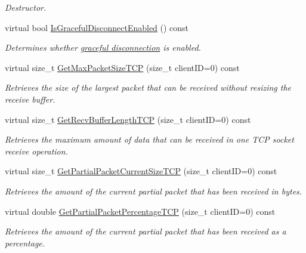 \begin{DoxyCompactItemize}
\begin{DoxyCompactList}\small\item\em Destructor. \item\end{DoxyCompactList}\item 
virtual bool \hyperlink{class_net_instance_implemented_t_c_p_ae675735ecca9c5dc9a8502cc97cee13d}{IsGracefulDisconnectEnabled} () const 
\begin{DoxyCompactList}\small\item\em Determines whether \hyperlink{graceful_disconnect_page}{graceful disconnection} is enabled. \item\end{DoxyCompactList}\item 
virtual size\_\-t \hyperlink{class_net_instance_implemented_t_c_p_a51786db50076d9ef1499f95ef82627ff}{GetMaxPacketSizeTCP} (size\_\-t clientID=0) const 
\begin{DoxyCompactList}\small\item\em Retrieves the size of the largest packet that can be received without resizing the receive buffer. \item\end{DoxyCompactList}\item 
virtual size\_\-t \hyperlink{class_net_instance_implemented_t_c_p_a33b22ccf2a20a7fc5c40514e277a4522}{GetRecvBufferLengthTCP} (size\_\-t clientID=0) const 
\begin{DoxyCompactList}\small\item\em Retrieves the maximum amount of data that can be received in one TCP socket receive operation. \item\end{DoxyCompactList}\item 
virtual size\_\-t \hyperlink{class_net_instance_implemented_t_c_p_aba953b84f3380ab787bfbe6283eb9ec5}{GetPartialPacketCurrentSizeTCP} (size\_\-t clientID=0) const 
\begin{DoxyCompactList}\small\item\em Retrieves the amount of the current partial packet that has been received in bytes. \item\end{DoxyCompactList}\item 
virtual double \hyperlink{class_net_instance_implemented_t_c_p_a2ca4fa7ddd6ea7e6f3b5c1515d2e34ad}{GetPartialPacketPercentageTCP} (size\_\-t clientID=0) const 
\begin{DoxyCompactList}\small\item\em Retrieves the amount of the current partial packet that has been received as a percentage. \item\end{DoxyCompactList}\item 

\end{DoxyCompactItemize}
